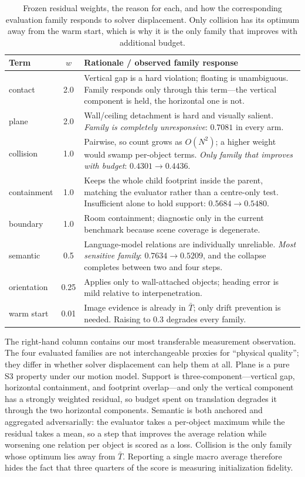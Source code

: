 \documentclass[10pt,twocolumn]{article}
\begin{document}
\begin{table}[t]
\centering
\caption{Frozen residual weights, the reason for each, and how the
corresponding evaluation family responds to solver displacement.  Only
collision has its optimum away from the warm start, which is why it is the only
family that improves with additional budget.}
\label{tab:weights}
\small
\begin{tabular}{@{}lcp{3.55cm}@{}}
\toprule
Term & $w$ & Rationale / observed family response \\
\midrule
contact & 2.0 & Vertical gap is a hard violation; floating is unambiguous.
Family responds only through this term---the vertical component is held, the
horizontal one is not. \\
plane & 2.0 & Wall/ceiling detachment is hard and visually salient.
\emph{Family is completely unresponsive}: $0.7081$ in every arm. \\
collision & 1.0 & Pairwise, so count grows as $O(N^2)$; a higher weight would
swamp per-object terms.  \emph{Only family that improves with budget}:
$0.4301\!\to\!0.4436$. \\
containment & 1.0 & Keeps the whole child footprint inside the parent, matching
the evaluator rather than a centre-only test.  Insufficient alone to hold
support: $0.5684\!\to\!0.5480$. \\
boundary & 1.0 & Room containment; diagnostic only in the current benchmark
because scene coverage is degenerate. \\
semantic & 0.5 & Language-model relations are individually unreliable.
\emph{Most sensitive family}: $0.7634\!\to\!0.5209$, and the collapse completes
between two and four steps. \\
orientation & 0.25 & Applies only to wall-attached objects; heading error is
mild relative to interpenetration. \\
warm start & 0.01 & Image evidence is already in $\bar T$; only drift
prevention is needed.  Raising to $0.3$ degrades every family. \\
\bottomrule
\end{tabular}
\end{table}

The right-hand column contains our most transferable measurement observation.
The four evaluated families are not interchangeable proxies for ``physical
quality''; they differ in whether solver displacement can help them at all.
Plane is a pure S3 property under our motion model.  Support is
three-component---vertical gap, horizontal containment, and footprint
overlap---and only the vertical component has a strongly weighted residual, so
budget spent on translation degrades it through the two horizontal components.
Semantic is both anchored and aggregated adversarially: the evaluator takes a
per-object maximum while the residual takes a mean, so a step that improves the
average relation while worsening one relation per object is scored as a loss.
Collision is the only family whose optimum lies away from $\bar T$.  Reporting
a single macro average therefore hides the fact that three quarters of the
score is measuring initialization fidelity.
\end{document}
